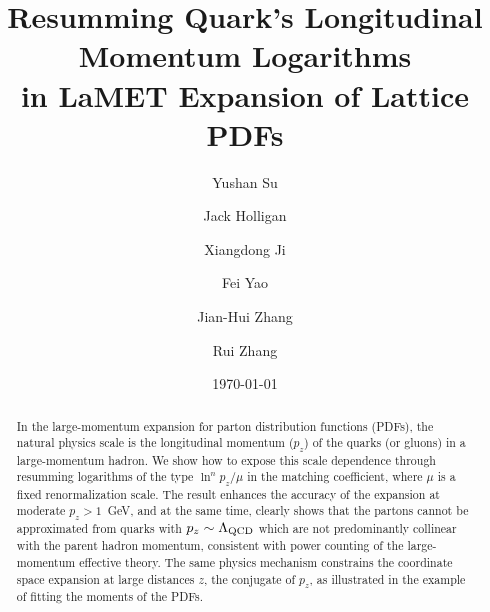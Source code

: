 \documentclass[prd,aps,twocolumn,preprintnumbers, showpacs, nofootinbib,superscriptaddress,notitlepage]{revtex4-2}
\begin{document}
\title{Resumming Quark's Longitudinal Momentum Logarithms \\in LaMET Expansion of 
Lattice PDFs}

\author{Yushan Su}

\author{Jack Holligan}

\author{Xiangdong Ji}

\author{Fei Yao}

\author{Jian-Hui Zhang}

\author{Rui Zhang}


\date{\today}

\begin{abstract}

In the large-momentum expansion for parton distribution functions (PDFs), 
the natural physics scale is the longitudinal 
momentum ($p_z$) of the quarks (or gluons) in a large-momentum hadron. 
We show how to expose this scale dependence through resumming
logarithms of the type $\ln^n p_z/\mu$ in the matching
coefficient, where $\mu$ is a fixed renormalization scale. The result enhances the accuracy of the expansion at moderate $p_z>1$~GeV, and at the same time, 
clearly shows that the partons cannot
be approximated from quarks with $p_z \sim \Lambda_{\rm QCD}$ which are not predominantly
collinear with the parent hadron momentum, consistent with
power counting of the large-momentum effective theory. The same
physics mechanism constrains the coordinate 
space expansion at large distances $z$, the conjugate of $p_z$, 
as illustrated in the example of fitting the moments of the PDFs.

\end{abstract}
\end{document}
